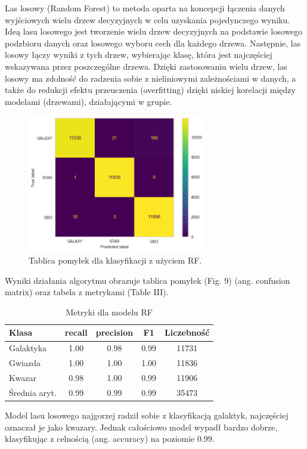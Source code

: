 \documentclass[conference]{IEEEtran}
\begin{document}
Las losowy (Random Forest) to metoda oparta na koncepcji łączenia danych wyjściowych wielu drzew decyzyjnych w celu uzyskania pojedynczego wyniku. Ideą lasu losowego jest tworzenie wielu drzew decyzyjnych na podstawie losowego podzbioru danych oraz losowego wyboru cech dla każdego drzewa. Następnie, las losowy łączy wyniki z tych drzew, wybierając klasę, która jest najczęściej wskazywana przez poszczególne drzewa. Dzięki zastosowaniu wielu drzew, las losowy ma zdolność do radzenia sobie z nieliniowymi zależnościami w danych, a także do redukcji efektu przeuczenia (overfitting) dzięki niskiej korelacji między modelami (drzewami), działającymi w grupie.
\begin{figure}[ht]
        \centering
        \includegraphics[width = 7.8cm]{figures/rf_conf_mat.png}
        \caption{Tablica pomyłek dla klasyfikacji z użyciem RF.}
        \label{fig:my_label}
\end{figure}
Wyniki działania algorytmu obrazuje tablica pomyłek (Fig. 9) (ang. confusion matrix) oraz tabela z metrykami (Table III).

\begin{table}[ht]
    \centering
    \begin{tabular}{|l|c|c|c|c|}
        \hline
        Klasa & recall & precision &  F1 & Liczebność\\
        \hline
        Galaktyka &  1.00 & 0.98 & 0.99 & 11731 \\
        \hline
        Gwiazda &  1.00 & 1.00 &  1.00 & 11836 \\
        \hline
        Kwazar & 0.98 &  1.00 & 0.99 & 11906 \\
        \hline
        Średnia aryt. & 0.99 & 0.99 & 0.99 & 35473 \\
        \hline
    \end{tabular}
    \caption{Metryki dla modelu RF}
\end{table}
Model lasu losowego najgorzej radził sobie z klasyfikacją galaktyk, najczęściej oznaczał je jako kwazary. Jednak całościowo model wypadł bardzo dobrze, klasyfikując z celnością (ang. accuracy) na poziomie 0.99. 
\end{document}
